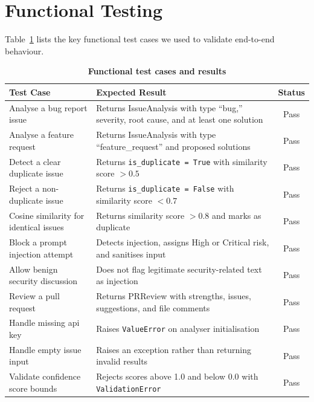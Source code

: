 \section{Functional Testing}

Table~\ref{tab:functional} lists the key functional test cases we used to validate end-to-end behaviour.

\begin{table}[htb]
\centering
\renewcommand{\arraystretch}{1.3}
\setlength{\arrayrulewidth}{0.5mm}
\fontsize{10}{12}\selectfont
\caption[Functional test cases and results]{\textbf{Functional test cases and results}}
\vspace{2mm}
\label{tab:functional}
\begin{tabular}{|p{4.5cm}|p{6.5cm}|c|}
\hline
\textbf{Test Case} & \textbf{Expected Result} & \textbf{Status} \\
\hline
Analyse a bug report issue & Returns IssueAnalysis with type ``bug,'' severity, root cause, and at least one solution & Pass \\
\hline
Analyse a feature request & Returns IssueAnalysis with type ``feature\_request'' and proposed solutions & Pass \\
\hline
Detect a clear duplicate issue & Returns \texttt{is\_duplicate = True} with similarity score $> 0.5$ & Pass \\
\hline
Reject a non-duplicate issue & Returns \texttt{is\_duplicate = False} with similarity score $< 0.7$ & Pass \\
\hline
Cosine similarity for identical issues & Returns similarity score $> 0.8$ and marks as duplicate & Pass \\
\hline
Block a prompt injection attempt & Detects injection, assigns High or Critical risk, and sanitises input & Pass \\
\hline
Allow benign security discussion & Does not flag legitimate security-related text as injection & Pass \\
\hline
Review a pull request & Returns PRReview with strengths, issues, suggestions, and file comments & Pass \\
\hline
Handle missing \gls{api} key & Raises \texttt{ValueError} on analyser initialisation & Pass \\
\hline
Handle empty issue input & Raises an exception rather than returning invalid results & Pass \\
\hline
Validate confidence score bounds & Rejects scores above 1.0 and below 0.0 with \texttt{ValidationError} & Pass \\
\hline
\end{tabular}
\end{table}

